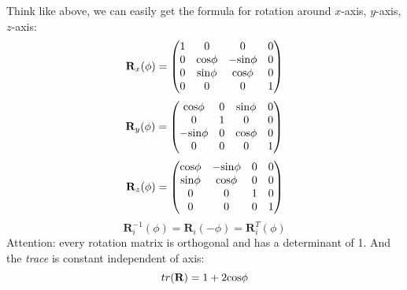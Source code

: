 \documentclass[10pt, a4paper]{article}
\begin{document}
            Think like above, we can easily get the formula for rotation around $x$-axis, $y$-axis, $z$-axis:
            \newline
            \begin{equation*}
                \textbf{R}_{x}(\phi) = 
                \begin{pmatrix}
                    1 & 0 & 0 & 0\\
                    0 & \rm{cos\phi} & \rm{-sin\phi} & 0\\
                    0 & \rm{sin\phi} & \rm{cos\phi} & 0\\
                    0 & 0 & 0 & 1 
                \end{pmatrix}
            \end{equation*}
            \newline
            \begin{equation*}
                \textbf{R}_{y}(\phi) = 
                \begin{pmatrix}
                    \rm{cos\phi} & 0 & \rm{sin\phi} & 0\\
                    0 & 1 & 0 & 0\\
                    \rm{-sin\phi} & 0 & \rm{cos\phi} & 0 \\
                    0 & 0 & 0 & 1
                \end{pmatrix}
            \end{equation*}
            \newline
            \begin{equation*}
                \textbf{R}_{z}(\phi) = 
                \begin{pmatrix}
                    \rm{cos\phi} & \rm{-sin\phi} & 0 & 0\\
                    \rm{sin\phi} & \rm{cos\phi} & 0 & 0\\
                    0 & 0 & 1 & 0\\
                    0 & 0 & 0 & 1
                \end{pmatrix}
            \end{equation*}
            $$\textbf{R}^{-1}_i(\phi) = \textbf{R}_i(-\phi) = \textbf{R}_i^T(\phi)$$
            \indent Attention: every rotation matrix is orthogonal and has a determinant of 1. And the \emph{trace} is constant independent of axis:$$tr(\textbf{R}) = 1 + 2\rm{cos\phi}$$
        
\end{document}
